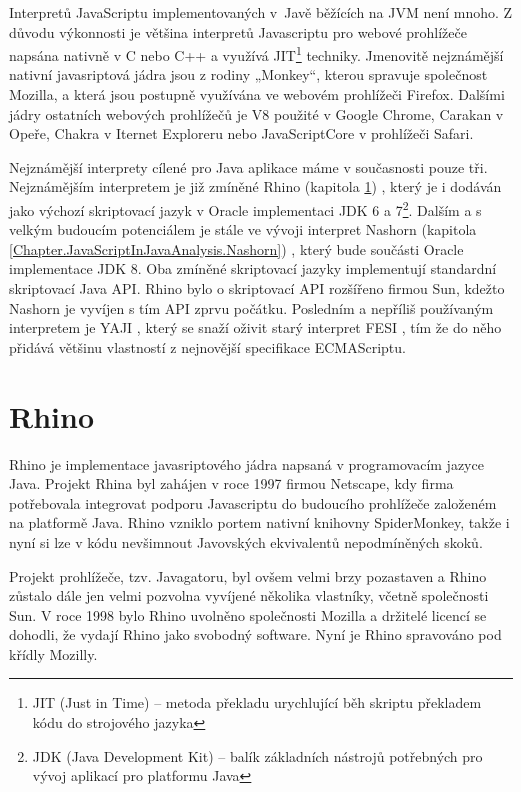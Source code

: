 Interpretů JavaScriptu implementovaných v~Javě běžících na JVM není mnoho. Z důvodu výkonnosti je většina interpretů Javascriptu pro webové prohlížeče napsána nativně v C nebo C++ a využívá JIT\footnote{JIT (Just in Time) -- metoda překladu urychlující běh skriptu překladem kódu do strojového jazyka} techniky. Jmenovitě nejznámější nativní javasriptová jádra jsou z rodiny „Monkey“, kterou spravuje společnost Mozilla, a která jsou postupně využívána ve webovém prohlížeči Firefox. Dalšími jádry ostatních webových prohlížečů je V8 použité v Google Chrome, Carakan v Opeře, Chakra v Iternet Exploreru nebo JavaScriptCore v prohlížeči Safari.

Nejznámější interprety cílené pro Java aplikace máme v současnosti pouze tři. Nejznámějším interpretem je již zmíněné Rhino (kapitola \ref{Chapter.JavaScriptInJavaAnalysis.Rhino}) \cite{Bibliography.Rhino.Docs}, který je i dodáván jako výchozí skriptovací jazyk v Oracle implementaci JDK 6 a 7\footnote{JDK (Java Development Kit) -- balík základních nástrojů potřebných pro vývoj aplikací pro platformu Java}. Dalším a s velkým budoucím potenciálem je stále ve vývoji interpret Nashorn (kapitola \ref{Chapter.JavaScriptInJavaAnalysis.Nashorn}) \cite{Bibliography.Nashorn.Project}, který bude součásti Oracle implementace JDK 8. Oba zmíněné skriptovací jazyky implementují standardní skriptovací Java API. Rhino bylo o skriptovací API rozšířeno firmou Sun, kdežto Nashorn je vyvíjen s tím API zprvu počátku. Posledním a nepříliš používaným interpretem je YAJI \cite{Bibliography.YAJI.Project}, který se snaží oživit starý interpret FESI \cite{Bibliography.FESI.Project}, tím že do něho přidává většinu vlastností z nejnovější specifikace ECMAScriptu.

\section{Rhino}
\label{Chapter.JavaScriptInJavaAnalysis.Rhino}

Rhino je implementace javasriptového jádra napsaná v programovacím jazyce Java. Projekt Rhina byl zahájen v roce 1997 firmou Netscape, kdy firma potřebovala integrovat podporu Javascriptu do budoucího prohlížeče založeném na platformě Java. Rhino vzniklo portem nativní knihovny SpiderMonkey, takže i nyní si lze v kódu nevšimnout Javovských ekvivalentů nepodmíněných skoků. \cite{Bibliography.Rhino.History}

Projekt prohlížeče, tzv. Javagatoru, byl ovšem velmi brzy pozastaven a Rhino zůstalo dále jen velmi pozvolna vyvíjené několika vlastníky, včetně společnosti Sun. V roce 1998 bylo Rhino uvolněno společnosti Mozilla a držitelé licencí se dohodli, že vydají Rhino jako svobodný software. Nyní je Rhino spravováno pod křídly Mozilly. \cite{Bibliography.Rhino.History}

